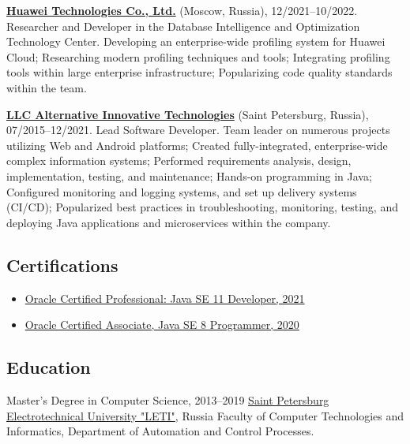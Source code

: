 \documentclass{vl}
\begin{document}
    \textbf{\href{https://www.huawei.com}{Huawei Technologies Co., Ltd.}} (Moscow, Russia), 12/2021--10/2022.\newline
    Researcher and Developer in the Database Intelligence and Optimization Technology Center.\newline
    Developing an enterprise-wide profiling system for Huawei Cloud;
    Researching modern profiling techniques and tools;
    Integrating profiling tools within large enterprise infrastructure;
    Popularizing code quality standards within the team.

    \textbf{\href{https://altinntech.com/en/}{LLC Alternative Innovative Technologies}} (Saint Petersburg, Russia), 07/2015--12/2021.
    Lead Software Developer.\newline
    Team leader on numerous projects utilizing Web and Android platforms;
    Created fully-integrated, enterprise-wide complex information systems;
    Performed requirements analysis, design, implementation, testing, and maintenance;
    Hands-on programming in Java;
    Configured monitoring and logging systems, and set up delivery systems (CI/CD);
    Popularized best practices in troubleshooting, monitoring, testing, and deploying Java applications
    and microservices within the company.

    \subsection*{Certifications}

    \begin{itemize}
        \item \href{https://catalog-education.oracle.com/pls/certview/sharebadge?id=87F6A2FE819A5A5AF4120A05900AB28A461EE9A3EE9FBFA02721FADAEB3BCE19}{Oracle Certified Professional: Java SE 11 Developer, 2021}
        \item \href{https://www.credly.com/badges/e2d9ddda-20dc-433d-8ab7-18548fd0fd8f/public_url}{Oracle Certified Associate, Java SE 8 Programmer, 2020}
    \end{itemize}

    \subsection*{Education}

    \begin{samepage}
        Master's Degree in Computer Science, 2013--2019\newline
        \href{https://etu.ru/en/university/}{Saint Petersburg Electrotechnical University "LETI"}, Russia\newline
        Faculty of Computer Technologies and Informatics, Department of Automation and Control Processes.
    \end{samepage}
\end{document}
